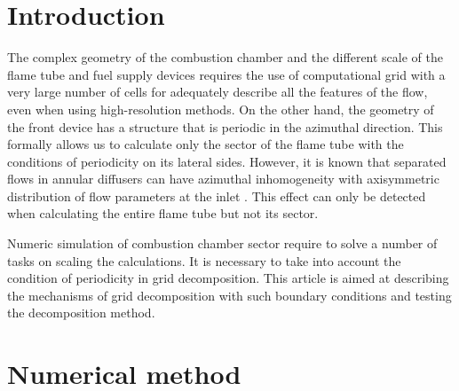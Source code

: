 \documentclass[
11pt,%
tightenlines,%
twoside,%
onecolumn,%
nofloats,%
nobibnotes,%
nofootinbib,%
superscriptaddress,%
noshowpacs,%
centertags]%
{revtex4}
\begin{document}
\maketitle


\section{Introduction}

The complex geometry of the combustion chamber and the different scale of the
flame tube and fuel supply devices requires the use of computational grid with
 a very large number of cells for adequately describe all the features of the flow,
  even when using high-resolution methods.
On the other hand, the geometry of the front device has a structure that is periodic in the azimuthal direction.
This formally allows us to calculate only the sector of the flame
tube with the conditions of periodicity on its lateral sides.
However, it is known that separated flows in annular diffusers can have azimuthal inhomogeneity with axisymmetric distribution of flow parameters at the inlet \cite{Lyub_Diffusers}.
This effect can only be detected when calculating the entire flame tube but not its sector.

Numeric simulation of combustion chamber sector require to solve a number
 of tasks on scaling the calculations. It is necessary to take into account the
 condition of periodicity in grid decomposition. This article is aimed at describing
 the mechanisms of grid decomposition with such boundary conditions and testing the decomposition method.

\section{Numerical method}
\end{document}
